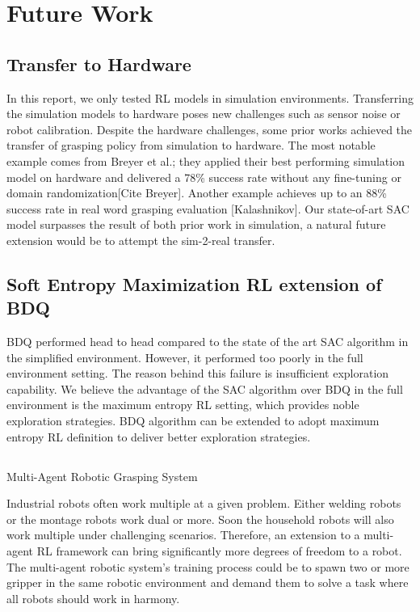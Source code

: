 \section{Future Work}

\subsection{Transfer to Hardware}
 
In this report, we only tested RL models in simulation environments. Transferring the simulation models to hardware poses new challenges such as sensor noise or robot calibration. Despite the hardware challenges, some prior works achieved the transfer of grasping policy from simulation to hardware. The most notable example comes from Breyer et al.; they applied their best performing simulation model on hardware and delivered a 78\% success rate without any fine-tuning or domain randomization[Cite Breyer]. Another example achieves up to an 88\% success rate in real word grasping evaluation [Kalashnikov]. Our state-of-art SAC model surpasses the result of both prior work in simulation, a natural future extension would be to attempt the sim-2-real transfer.
 
\subsection{Soft Entropy Maximization RL extension of BDQ}
 
BDQ performed head to head compared to the state of the art SAC algorithm in the simplified environment. However, it performed too poorly in the full environment setting. The reason behind this failure is insufficient exploration capability. We believe the advantage of the SAC algorithm over BDQ in the full environment is the maximum entropy RL setting, which provides noble exploration strategies. BDQ algorithm can be extended to adopt maximum entropy RL definition to deliver better exploration strategies.
 
\subsection{}{Multi-Agent Robotic Grasping System}
 
Industrial robots often work multiple at a given problem. Either welding robots or the montage robots work dual or more. Soon the household robots will also work multiple under challenging scenarios. Therefore, an extension to a multi-agent RL framework can bring significantly more degrees of freedom to a robot. 
The multi-agent robotic system's training process could be to spawn two or more gripper in the same robotic environment and demand them to solve a task where all robots should work in harmony.
 
